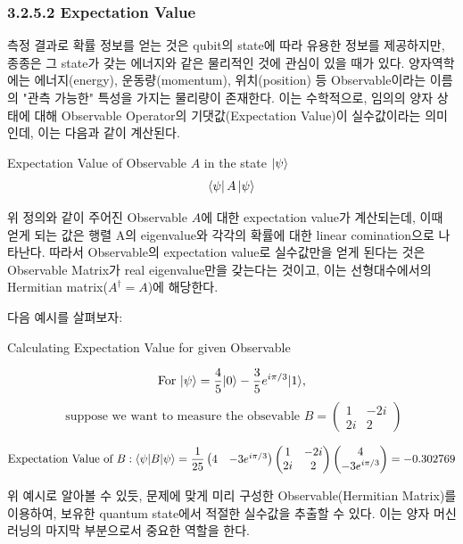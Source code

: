 \subsubsection{3.2.5.2 \quad Expectation Value}

측정 결과로 확률 정보를 얻는 것은 qubit의 state에 따라 유용한 정보를 제공하지만, 종종은 그 state가 갖는 에너지와 같은 물리적인 것에 관심이 있을 때가 있다. 양자역학에는 에너지(energy), 운동량(momentum), 위치(position) 등 Observable이라는 이름의 "관측 가능한" 특성을 가지는 물리량이 존재한다. 이는 수학적으로, 임의의 양자 상태에 대해 Observable Operator의 기댓값(Expectation Value)이 실수값이라는 의미인데, 이는 다음과 같이 계산된다.
\begin{definition}
    Expectation Value of Observable \(A\) in the state \(\ket \psi\)
    \[
        \bra{\psi}A\ket{\psi}
    \]
\end{definition}

위 정의와 같이 주어진 Observable \(A\)에 대한 expectation value가 계산되는데, 이때 얻게 되는 값은 행렬 A의 eigenvalue와 각각의 확률에 대한 linear comination으로 나타난다. 따라서 Observable의 expectation value로 실수값만을 얻게 된다는 것은 Observable Matrix가 real eigenvalue만을 갖는다는 것이고, 이는 선형대수에서의 Hermitian matrix(\(A^\dagger = A\))에 해당한다.

\noindent 다음 예시를 살펴보자:

\begin{example} Calculating Expectation Value for given Observable

\[
    \text{For } |\psi\rangle = {4\over 5}|0\rangle - {3 \over 5}e^{i\pi / 3}|1\rangle, 
\]
\[
\text{ suppose we want to measure the obsevable } B = \left( \begin{matrix}
    1 & -2i \\
    2i & 2
    \end{matrix}\right)
\]

\begin{align*}
    \text{Expectation Value of } B : \langle\psi|B|\psi\rangle = {1 \over 25} \left(\begin{matrix}4 & -3e^{i\pi/3}\end{matrix}\right)\left(\begin{matrix}
        1 & -2i \\
        2i & 2
        \end{matrix}\right)\left(\begin{matrix} 4 \\ -3e^{i\pi /3}\end{matrix}\right) = -0.302769
\end{align*}

\end{example}
위 예시로 알아볼 수 있듯, 문제에 맞게 미리 구성한 Observable(Hermitian Matrix)를 이용하여, 보유한 quantum state에서 적절한 실수값을 추출할 수 있다. 이는 양자 머신러닝의 마지막 부분으로서 중요한 역할을 한다.

